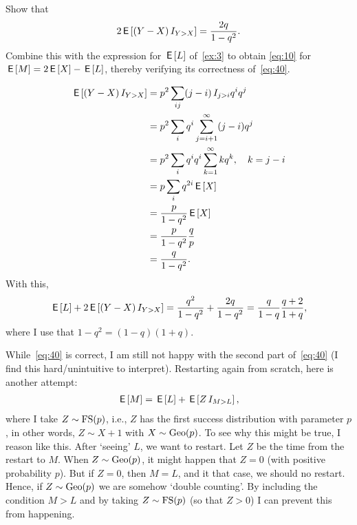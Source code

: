 \documentclass[a4paper,12pt]{article}
\begin{document}
\begin{exercise}\label{ex:9}
Show that 
\begin{equation}
  \label{eq:41}
2\,\mathsf{E}\left[(Y-X) \,I_{Y>X}\right] = \frac{2q} {1-q^{2}}.
\end{equation}
Combine this with the expression for $\,\mathsf{E}\left[L\right]$ of~\cref{ex:3} to obtain \cref{eq:10} for $\,\mathsf{E}\left[M\right] = 2\,\mathsf{E}\left[X\right] - \,\mathsf{E}\left[L\right]$, thereby verifying its correctness of~\cref{eq:40}. 
\begin{solution}
  \begin{align}
    \label{eq:42}
\,\mathsf{E}\left[(Y-X) \,I_{Y>X}\right] 
&= p^2\sum_{ij} (j-i)\,I_{j>i} q^iq^j\\
&= p^2\sum_{i} q^i\sum_{j=i+1}^{\infty}(j-i)q^j\\
&= p^2\sum_{i} q^i q^{i}\sum_{k=1}^{\infty}kq^k, \quad k = j-i\\
&= p\sum_{i}  q^{2i}\,\mathsf{E}\left[X\right] \\
&= \frac{p}{1-q^{2}}\,\mathsf{E}\left[X\right] \\
&= \frac{p}{1-q^{2}}\frac q p \\
&= \frac{q}{1-q^{2}}.
  \end{align}
With this, 
\begin{align}
  \label{eq:43}
\,\mathsf{E}\left[L\right] + 2  \,\mathsf{E}\left[(Y-X) \,I_{Y>X}\right] = \frac{q^{2}}{1-q^2} +  \frac{2q}{1-q^{2}} = \frac q{1-q}\frac{q+2}{1+q},
\end{align}
where I use that $1-q^{2}=(1-q)(1+q)$.
\end{solution}
\end{exercise}

While~\cref{eq:40} is correct, I am still not happy with the second part of~\eqref{eq:40} (I find this hard/unintuitive to interpret).
Restarting again from scratch, here is another attempt: 
\begin{align}
  \label{eq:44}
\,\mathsf{E}\left[M\right] = \,\mathsf{E}\left[L\right] + \,\mathsf{E}\left[ Z \,I_{M>L}\right],
\end{align}
where I take $Z\sim \mathrm{FS}(p)$, i.e., $Z$ has the first success distribution with parameter $p$, in other words, $Z \sim X+1$ with $X\sim\mathrm{Geo}(p)$.
To see why this might be true, I reason like this.
After `seeing' $L$, we want to restart.
Let $Z$ be the time from the restart to $M$.
When $Z\sim \mathrm{Geo}(p)$, it might happen that $Z=0$ (with positive probability $p$).
But if $Z=0$, then $M=L$, and it that case, we should no restart.
Hence, if $Z\sim \mathrm{Geo}(p)$ we are somehow `double counting'.
By including the condition $M>L$ and by taking $Z\sim\mathrm{FS}(p)$ (so that $Z>0$) I can prevent this from happening.
\end{document}
